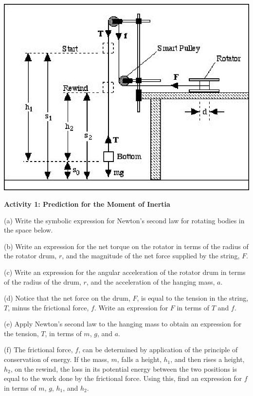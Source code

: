 \vspace{0.3cm}
{\par\centering \includegraphics{moment_inertia/moment_inertia_fig1.eps} \par}
\vspace{0.3cm}

\pagebreak[2]
\textbf{Activity 1: Prediction for the Moment of Inertia} 

(a) Write the symbolic expression for Newton's second law for rotating bodies
in the space below.
\answerspace{10mm}

(b) Write an expression for the net torque on the rotator in terms of the radius
of the rotator drum, $r$, and the magnitude of the net force supplied by the string,
$F$.
\answerspace{10mm}

(c) Write an expression for the angular acceleration of the rotator drum in
terms of the radius of the drum, $r$, and the acceleration of the hanging mass,
$a$.
\answerspace{10mm}

(d) Notice that the net force on the drum, $F$, is equal to the tension in the
string, $T$, minus the frictional force, $f$. Write an expression for 
$F$ in terms
of $T$ and $f$.
\answerspace{10mm}

(e) Apply Newton's second law to the hanging mass to obtain an expression for
the tension, $T$, in terms of $m$, $g$, and $a$.
\answerspace{20mm}

(f) The frictional force, $f$, can be determined by application of the principle
of conservation of energy. If the mass, $m$, falls a height, \( h_{1} \), and
then rises a height, \( h_{2} \), on the rewind, the loss in its potential
energy between the two positions is equal to the work done by the frictional
force. Using this, find an expression for $f$ in terms of $m$, $g$, \( h_{1} \),
and \( h_{2} \).
\answerspace{20mm}

